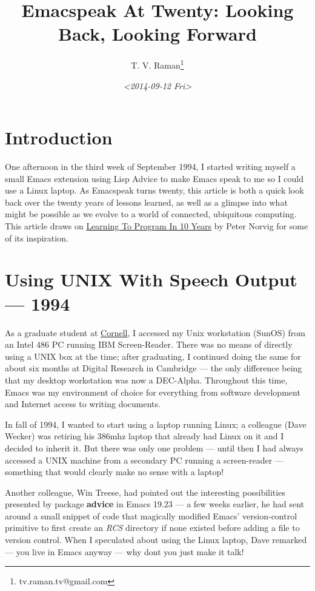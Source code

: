\documentclass[11pt]{article}
\author{T. V. Raman\thanks{tv.raman.tv@gmail.com}}
\date{\textit{<2014-09-12 Fri>}}
\title{Emacspeak At Twenty: Looking Back, Looking Forward}
\begin{document}
\maketitle
\tableofcontents

\section{Introduction}
\label{sec:org4f141b7}

One afternoon in the third week of September 1994, I started
writing myself a small Emacs extension using Lisp Advice to make
Emacs speak to me so I could use a Linux laptop. As Emacspeak
turns twenty, this article is both a quick look back over the
twenty years of lessons learned, as well as a glimpse into what
might be possible as we evolve to a world of connected,
ubiquitous computing. This article draws on \href{http://norvig.com/21-days.html}{Learning To Program
In 10 Years} by Peter Norvig for some of its inspiration.

\section{Using UNIX With Speech Output —  1994}
\label{sec:org0403a1f}

As a graduate student at \href{http://www.cs.cornell.edu/info/people/raman/raman.html}{Cornell}, I accessed my Unix workstation
(SunOS) from an Intel 486 PC running IBM Screen-Reader. There
 was no means of directly using a UNIX box at the time; after
 graduating, I continued doing the same for about six months at
 Digital Research in Cambridge — the only difference being that
 my desktop workstation was now a DEC-Alpha. Throughout this
 time, Emacs was my environment of choice for everything from
 software development and Internet access to writing documents.


In fall of 1994, I wanted to start using a laptop running Linux;
a colleague (Dave Wecker) was retiring his 386mhz laptop that
already had Linux on it and I decided to inherit it. But there
was only one problem — until then I had always accessed a UNIX
machine from a secondary PC running a screen-reader — something
that would clearly make no sense with a laptop!

Another colleague, Win Treese, had pointed out the interesting
possibilities presented by package \textbf{advice} in Emacs 19.23 — a
few weeks earlier, he had sent around a small snippet of code
that magically modified Emacs' version-control primitive to first
create an \emph{RCS} directory if none existed before adding a file to
version control. When I speculated about using the Linux laptop,
Dave remarked — you live in Emacs anyway — why dont you just make
it talk!
\end{document}
